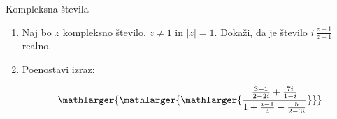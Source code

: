 \begin{frame}{Kompleksna števila}
	\begin{enumerate}
		\item
		Naj bo $z$ kompleksno število, $z \ne 1$ in $ |z| = 1 $.
		Dokaži, da je število \( i \, \frac{z+1}{z-1} \) realno.
		\item
		Poenostavi izraz:
		
		\[
		\mathlarger{\mathlarger{\mathlarger{\frac{\frac{3 + 1}{2 - 2i} + \frac{7i}{1 - i}}{1 + \frac{i - 1}{4} - \frac{5}{2 - 3i}}}}}
		\]
	\end{enumerate}
\end{frame}